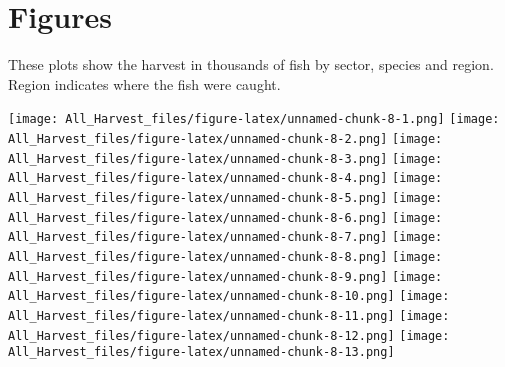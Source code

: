 \documentclass[]{article}
\begin{document}
\hypertarget{figures}{%
\section{Figures}\label{figures}}

These plots show the harvest in thousands of fish by sector, species and
region. Region indicates where the fish were caught.

\texttt{[image: All\_Harvest\_files/figure-latex/unnamed-chunk-8-1.png]}
\texttt{[image: All\_Harvest\_files/figure-latex/unnamed-chunk-8-2.png]}
\texttt{[image: All\_Harvest\_files/figure-latex/unnamed-chunk-8-3.png]}
\texttt{[image: All\_Harvest\_files/figure-latex/unnamed-chunk-8-4.png]}
\texttt{[image: All\_Harvest\_files/figure-latex/unnamed-chunk-8-5.png]}
\texttt{[image: All\_Harvest\_files/figure-latex/unnamed-chunk-8-6.png]}
\texttt{[image: All\_Harvest\_files/figure-latex/unnamed-chunk-8-7.png]}
\texttt{[image: All\_Harvest\_files/figure-latex/unnamed-chunk-8-8.png]}
\texttt{[image: All\_Harvest\_files/figure-latex/unnamed-chunk-8-9.png]}
\texttt{[image: All\_Harvest\_files/figure-latex/unnamed-chunk-8-10.png]}
\texttt{[image: All\_Harvest\_files/figure-latex/unnamed-chunk-8-11.png]}
\texttt{[image: All\_Harvest\_files/figure-latex/unnamed-chunk-8-12.png]}
\texttt{[image: All\_Harvest\_files/figure-latex/unnamed-chunk-8-13.png]}
\end{document}
